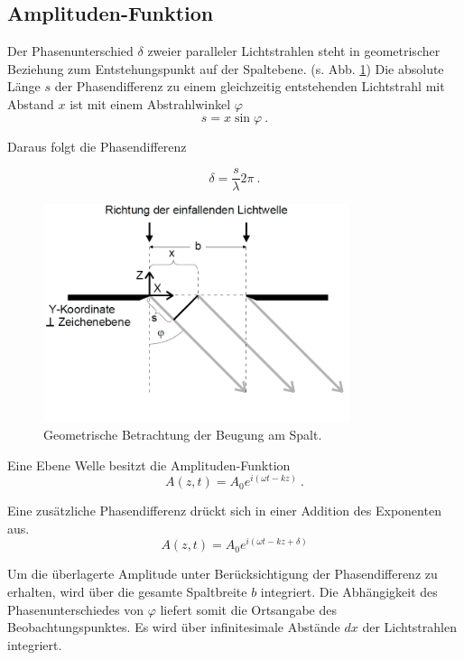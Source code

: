 \subsection{Amplituden-Funktion}
Der Phasenunterschied $\delta$ zweier paralleler Lichtstrahlen steht in geometrischer Beziehung zum Entstehungspunkt auf der Spaltebene. (s. Abb. \ref{fig:BeugSpalt})
Die absolute Länge $s$ der Phasendifferenz zu einem gleichzeitig entstehenden Lichtstrahl mit Abstand $x$ ist mit einem Abstrahlwinkel $\varphi$
\begin{equation}
  s = x\sin{\varphi} \:.
  \label{eqn:s}
\end{equation}

Daraus folgt die Phasendifferenz

\begin{equation}
  \delta = \frac{s}{\lambda}2\pi \:.
  \label{eqn:delta}
\end{equation}

\begin{figure}
  \centering
  \includegraphics[width=0.8\textwidth]{plots/Beugung Einzelspalt.png}
  \caption{Geometrische Betrachtung der Beugung am Spalt.}
  \label{fig:BeugSpalt}
\end{figure}

Eine Ebene Welle besitzt die Amplituden-Funktion 
\begin{equation}
  A(z, t) = A_0e^{i(\omega t - kz)} \:.
\end{equation}

Eine zusätzliche Phasendifferenz drückt sich in einer Addition des Exponenten aus.
\begin{equation*}
  A(z, t) = A_0e^{i(\omega t - kz + \delta)}
\end{equation*}

Um die überlagerte Amplitude unter Berücksichtigung der Phasendifferenz zu erhalten, wird über die gesamte Spaltbreite $b$ integriert.
Die Abhängigkeit des Phasenunterschiedes von $\varphi$ liefert somit die Ortsangabe des Beobachtungspunktes.
Es wird über infinitesimale Abstände $dx$ der Lichtstrahlen integriert.

